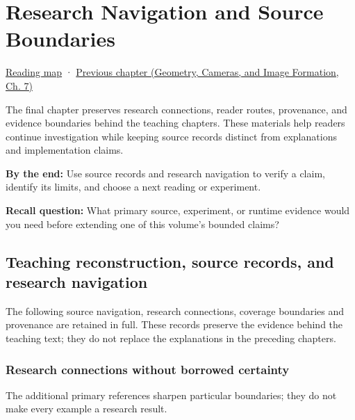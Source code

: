 \chapter{Research Navigation and Source Boundaries}\label{02-foundations-ii-ch039-research-navigation-and-source-boundaries}\hypertarget{02-foundations-ii-ch039}{}\label{stagechapter:02-foundations-ii-ch039}

\hyperref[volume-reading-map]{Reading map} · \href{../03-Geometry-Cameras-and-Image-Formation/main.pdf\#nameddest=02-foundations-ii-ch038-reconstruct-the-complete-geometry-pipeline}{Previous chapter (Geometry, Cameras, and Image Formation, Ch. 7)}

The final chapter preserves research connections, reader routes, provenance, and evidence boundaries behind the teaching chapters. These materials help readers continue investigation while keeping source records distinct from explanations and implementation claims.

\textbf{By the end:} Use source records and research navigation to verify a claim, identify its limits, and choose a next reading or experiment.

\textbf{Recall question:} What primary source, experiment, or runtime evidence would you need before extending one of this volume's bounded claims?

\section{Teaching reconstruction, source records, and research navigation}\label{02-foundations-ii-ch039-teaching-reconstruction-source-records-and-research-navigation}

The following source navigation, research connections, coverage boundaries and provenance are retained in full. These records preserve the evidence behind the teaching text; they do not replace the explanations in the preceding chapters.

\subsection{Research connections without borrowed certainty}\label{02-foundations-ii-ch039-research-connections-without-borrowed-certainty}

The additional primary references sharpen particular boundaries; they do not make every example a research result.

